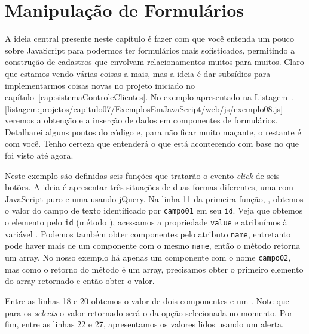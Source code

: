 \section{Manipulação de Formulários}

A ideia central presente neste capítulo é fazer com que você entenda um pouco sobre JavaScript para podermos ter formulários mais sofisticados, permitindo a construção de cadastros que envolvam relacionamentos muitos-para-muitos. Claro que estamos vendo várias coisas a mais, mas a ideia é dar subsídios para implementarmos coisas novas no projeto iniciado no capítulo~\ref{cap:sistemaControleClientes}. No exemplo apresentado na Listagem~\thechapter.\ref{listagem:projetos/capitulo07/ExemplosEmJavaScript/web/js/exemplo08.js} veremos a obtenção e a inserção de dados em componentes de formulários. Detalharei alguns pontos do código e, para não ficar muito maçante, o restante é com você. Tenho certeza que entenderá o que está acontecendo com base no que foi visto até agora.


Neste exemplo são definidas seis funções que tratarão o evento \textit{click} de seis botões. A ideia é apresentar três situações de duas formas diferentes, uma com JavaScript puro e uma usando jQuery. Na linha 11 da primeira função, , obtemos o valor do campo de texto identificado por \texttt{campo01} em seu \texttt{id}. Veja que obtemos o elemento pelo \texttt{id} (método ), acessamos a propriedade \texttt{value} e atribuímos à variável . Podemos também obter componentes pelo atributo \texttt{name}, entretanto pode haver mais de um componente com o mesmo \texttt{name}, então o método  retorna um array. No nosso exemplo há apenas um componente com o nome \texttt{campo02}, mas como o retorno do método  é um array, precisamos obter o primeiro elemento do array retornado e então obter o valor.

Entre as linhas 18 e 20 obtemos o valor de dois componentes  e um . Note que para os \textit{selects} o valor retornado será o da opção selecionada no momento. Por fim, entre as linhas 22 e 27, apresentamos os valores lidos usando um alerta.


